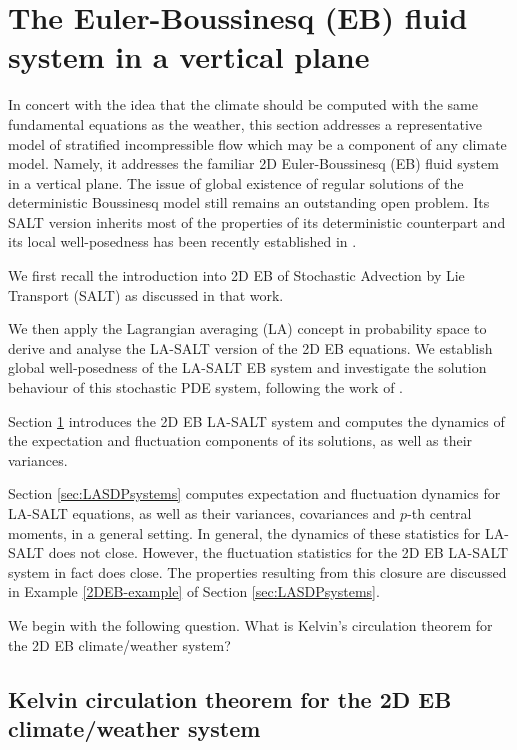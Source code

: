 \documentclass[11pt, oneside]{article}   	%
\numberwithin{equation}{section}
\theoremstyle{plain}
\theoremstyle{definition}
\theoremstyle{remark}
\newcommand{\<}{\langle}
\renewcommand{\>}{\rangle}
\begin{document}
\section{The Euler-Boussinesq (EB) fluid system in a vertical plane}\label{sec:EBsystem}

In concert with the idea that the climate should be computed with the same fundamental equations as the weather, this section addresses a representative model of stratified incompressible flow which may be a component of any climate model. Namely, it addresses the familiar 2D Euler-Boussinesq (EB) fluid system in a vertical plane. The issue of global existence of regular solutions of the deterministic Boussinesq model still remains an outstanding open problem. Its SALT version inherits most of the properties of its deterministic counterpart and its local well-posedness has been recently established in \cite{DieAytJNLS}.  

We first recall the introduction into 2D EB of Stochastic Advection by Lie Transport (SALT) as discussed in that work.  
  

We then apply the Lagrangian averaging (LA) concept in probability space to derive and analyse the LA-SALT version of the 2D EB equations.  We establish global well-posedness of the LA-SALT EB system and investigate the solution behaviour of this stochastic PDE system, following the work of \cite{DieAytJNLS}. 

Section \ref{sec:EBsystem} introduces the 2D EB LA-SALT system and computes the dynamics of the expectation and fluctuation components of its solutions, as well as their variances. 

Section \ref{sec:LASDPsystems} computes expectation and fluctuation dynamics for LA-SALT equations, as well as their variances, covariances and $p$-th central moments, in a general setting. In general, the dynamics of these statistics for LA-SALT does not close. However, the fluctuation statistics for the 2D EB LA-SALT system in fact does close. The properties resulting from this closure are discussed in Example \ref{2DEB-example} of Section \ref{sec:LASDPsystems}. 

We begin with the following question. What is Kelvin's circulation theorem for the 2D EB climate/weather system?

\subsection{Kelvin circulation theorem for the 2D EB climate/weather system}
\end{document}
